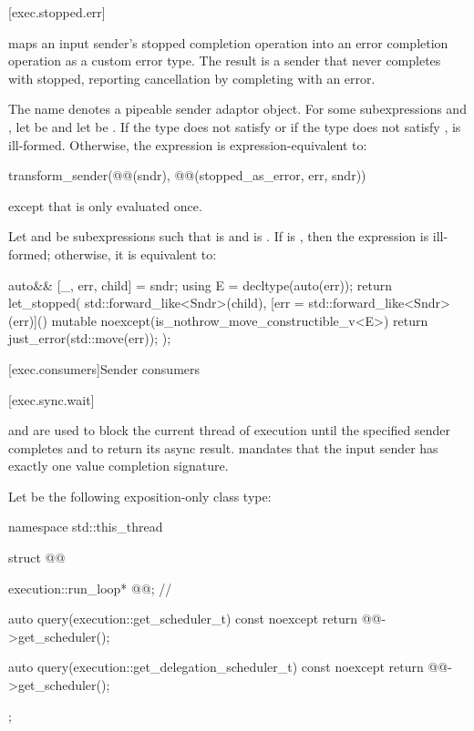 [exec.stopped.err]{}

\pnum
{} maps an input sender's stopped completion operation
into an error completion operation as a custom error type.
The result is a sender that never completes with stopped,
reporting cancellation by completing with an error.

\pnum
The name  denotes a pipeable sender adaptor object.
For some subexpressions  and ,
let  be  and
let  be .
If the type  does not satisfy  or
if the type  does not satisfy ,
 is ill-formed.
Otherwise, the expression 
is expression-equivalent to:
\begin{codeblock}
transform_sender(@@(sndr), @@(stopped_as_error, err, sndr))
\end{codeblock}
except that  is only evaluated once.

\pnum
Let  and  be subexpressions
such that  is  and
 is .
If  is ,
then the expression 
is ill-formed;
otherwise, it is equivalent to:
\begin{codeblock}
auto&& [_, err, child] = sndr;
using E = decltype(auto(err));
return let_stopped(
    std::forward_like<Sndr>(child),
    [err = std::forward_like<Sndr>(err)]() mutable noexcept(is_nothrow_move_constructible_v<E>) {
      return just_error(std::move(err));
    });
\end{codeblock}

[exec.consumers]{Sender consumers}

[exec.sync.wait]{}

\pnum
{} and 
are used
to block the current thread of execution
until the specified sender completes and
to return its async result.
 mandates
that the input sender has exactly one value completion signature.

\pnum
Let  be the following exposition-only class type:
\begin{codeblock}
namespace std::this_thread {
  struct @@ {
    execution::run_loop* @@;                                  // \expos

    auto query(execution::get_scheduler_t) const noexcept {
      return @@->get_scheduler();
    }

    auto query(execution::get_delegation_scheduler_t) const noexcept {
      return @@->get_scheduler();
    }
  };
}
\end{codeblock}

